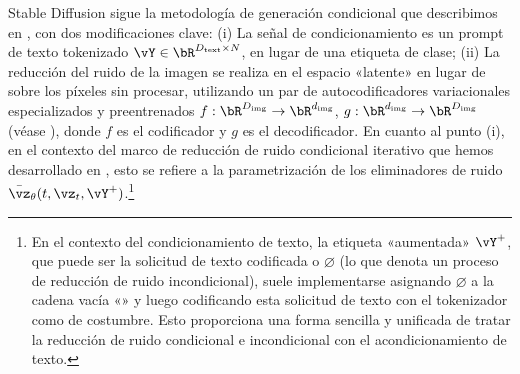 \documentclass[../../book-main_es.tex]{subfiles}
\begin{document}
Stable Diffusion sigue la metodología de generación condicional que describimos en
, con dos modificaciones clave: (i) La señal de condicionamiento es un
prompt de texto tokenizado $\vY \in
\bR^{D_{\mathrm{text}} \times N}$, en lugar de una etiqueta de clase; (ii)
La reducción del ruido de la imagen se
realiza en el espacio «latente» en lugar de sobre los píxeles sin procesar, utilizando un par 
de autocodificadores variacionales especializados y preentrenados $f : \bR^{D_{\mathrm{img}}} \to
\bR^{d_{\mathrm{img}}}$, $g : \bR^{d_{\mathrm{img}}} \to
\bR^{D_{\mathrm{img}}}$ (véase ), donde $f$
es el codificador y $g$ es el decodificador.
En cuanto al punto (i), en el contexto del marco de reducción de ruido condicional iterativo
que hemos
desarrollado en , esto se refiere a la parametrización de los eliminadores de ruido
$\bar{\vz}_{\theta}(t, \vz_t, \vY^+)$.\footnote{En el contexto del
    condicionamiento de texto, la etiqueta «aumentada» $\vY^+$, que puede ser la
    solicitud de texto
    codificada o $\varnothing$ (lo que denota un proceso de reducción de ruido incondicional),
    suele implementarse
    asignando $\varnothing$ a la cadena vacía «» y luego codificando esta solicitud de texto
    con el tokenizador como de costumbre. Esto proporciona una forma sencilla y unificada
    de tratar
la reducción de ruido condicional e incondicional con el acondicionamiento de texto.}
\end{document}
